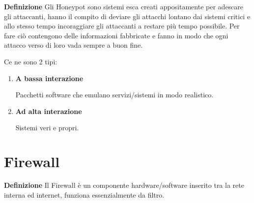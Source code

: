\documentclass{article}
\begin{document}
\noindent\textbf{Definizione} Gli Honeypot sono sistemi esca creati appositamente per adescare gli attaccanti, hanno il compito di deviare gli attacchi lontano dai sistemi critici e allo stesso tempo incoraggiare gli attaccanti a restare più tempo possibile. Per fare ciò contengono delle informazioni fabbricate e fanno in modo che ogni attacco verso di loro vada sempre a buon fine.\newline

\noindent Ce ne sono 2 tipi:
\begin{enumerate}
    \item \textbf{A bassa interazione}

        Pacchetti software che emulano servizi/sistemi in modo realistico.
    
    \item \textbf{Ad alta interazione}

        Sistemi veri e propri.
    
\end{enumerate}

\section{Firewall}

\noindent\textbf{Definizione} Il Firewall è un componente hardware/software inserito tra la rete interna ed internet, funziona essenzialmente da filtro.\newline
\end{document}
